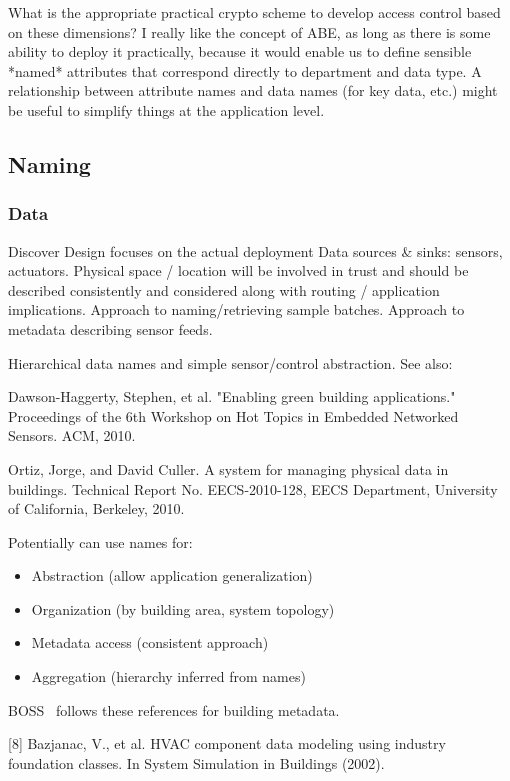 What is the appropriate practical crypto scheme to develop access control
based on these dimensions?  I really like the concept of ABE, as long as
there is some ability to deploy it practically, because it would enable us
to define sensible *named* attributes that correspond directly to
department and data type. A relationship between attribute names and data
names (for key data, etc.) might be useful to simplify things at the
application level.



\subsection{Naming}
\subsubsection{Data}

Discover
Design focuses on the actual deployment
Data sources \& sinks:  sensors, actuators.
Physical space / location will be involved in trust and should be described consistently and considered along with routing / application implications.
Approach to naming/retrieving sample batches. 
Approach to metadata describing sensor feeds. 

Hierarchical data names and simple sensor/control abstraction.
See also: 

Dawson-Haggerty, Stephen, et al. "Enabling green building applications." Proceedings of the 6th Workshop on Hot Topics in Embedded Networked Sensors. ACM, 2010.

Ortiz, Jorge, and David Culler. A system for managing physical data in buildings. Technical Report No. EECS-2010-128, EECS Department, University of California, Berkeley, 2010.

Potentially can use names for:
\begin{itemize}
\item Abstraction (allow application generalization)
\item Organization (by building area, system topology) 
\item Metadata access (consistent approach)
\item Aggregation (hierarchy inferred from names) 
\end{itemize} 



BOSS~\cite{Dawson-Haggerty2013BOSS} follows these references for building metadata. 

[8] Bazjanac, V., et al. HVAC component data modeling using industry foundation classes. In System Simulation in Buildings (2002). 

